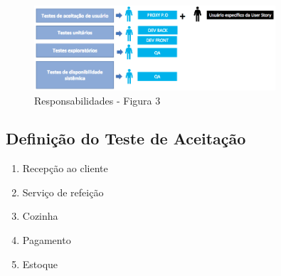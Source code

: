 \begin{figure}[H]
  \centering
  \includegraphics[width=0.8\textwidth]{softwareengineer/images/responsibilities-3} 
  \caption{Responsabilidades - Figura 3}
  \label{fig:responsibilities-3} 
\end{figure}






\subsection{Definição do Teste de Aceitação}

\begin{enumerate}
  \item Recepção ao cliente
  \item Serviço de refeição
  \item Cozinha
  \item Pagamento
  \item Estoque
\end{enumerate}

